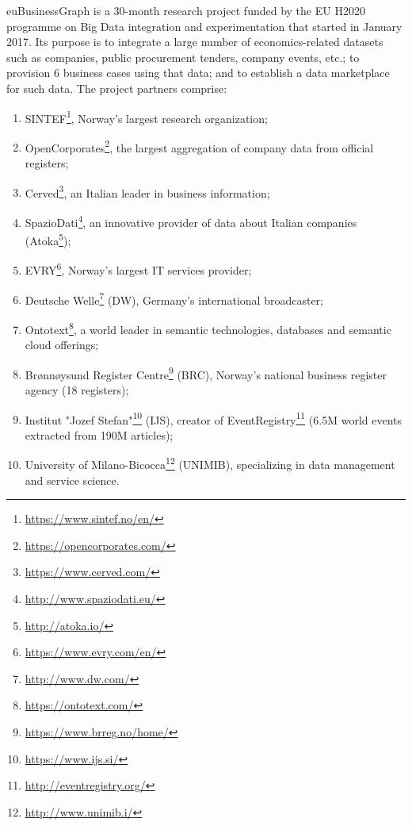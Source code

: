 \documentclass[runningheads,a4paper]{llncs}
\begin{document}
euBusinessGraph is a 30-month research project funded by the EU H2020 programme on Big Data integration and experimentation that started in January 2017. Its purpose is to integrate a large number of economics-related datasets such as companies, public procurement tenders, company events, etc.; to provision 6 business cases using that data; and to establish a data marketplace for such data. The project partners comprise:
\begin{enumerate}
\item SINTEF\footnote{\url{https://www.sintef.no/en/}}, Norway's largest research organization;
\item OpenCorporates\footnote{\url{https://opencorporates.com/}}, the largest aggregation of company data from official registers;
\item Cerved\footnote{\url{https://www.cerved.com/}}, an Italian leader in business information;
\item SpazioDati\footnote{\url{http://www.spaziodati.eu/}}, an innovative provider of data about Italian companies (Atoka\footnote{\url{http://atoka.io/}});
\item EVRY\footnote{\url{https://www.evry.com/en/}}, Norway's largest IT services provider;
\item Deutsche Welle\footnote{\url{http://www.dw.com/}} (DW), Germany's international broadcaster;
\item Ontotext\footnote{\url{https://ontotext.com/}}, a world leader in semantic technologies, databases and semantic cloud offerings;
\item Brønnøysund Register Centre\footnote{\url{https://www.brreg.no/home/}} (BRC), Norway's national business register agency (18 registers);
\item Institut "Jozef Stefan"\footnote{\url{https://www.ijs.si/}} (IJS), creator of EventRegistry\footnote{\url{http://eventregistry.org/}} (6.5M world events extracted from 190M articles);
\item University of Milano-Bicocca\footnote{\url{http://www.unimib.i/}} (UNIMIB), specializing in data management and service science.
\end{enumerate}
\end{document}
